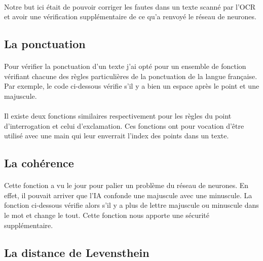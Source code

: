 \documentclass{article}
\begin{document}
\paragraph{}Notre but ici était de pouvoir corriger les fautes dans un texte scanné par l’OCR et avoir une vérification supplémentaire de ce qu’a renvoyé le réseau de neurones.

\subsection{La ponctuation}

\paragraph{}
Pour vérifier la ponctuation d’un texte j'ai opté pour un ensemble de fonction vérifiant chacune des règles particulières de la ponctuation de la langue française. Par exemple, le code ci-dessous vérifie s'il y a bien un espace après le point et une majuscule.

\paragraph{}Il existe deux fonctions similaires respectivement pour les règles du point d’interrogation et celui d’exclamation. Ces fonctions ont pour vocation d'être utilisé avec une main qui leur enverrait l’index des points dans un texte.

\subsection{La cohérence}
\paragraph{}Cette fonction a vu le jour pour palier un problème du réseau de neurones. En effet, il pouvait arriver que l'IA confonde une majuscule avec une minuscule. La fonction ci-dessous vérifie alors s’il y a plus de lettre majuscule ou minuscule dans le mot et change le tout.  Cette fonction nous apporte une sécurité supplémentaire.

\subsection{La distance de Levensthein}
\end{document}
